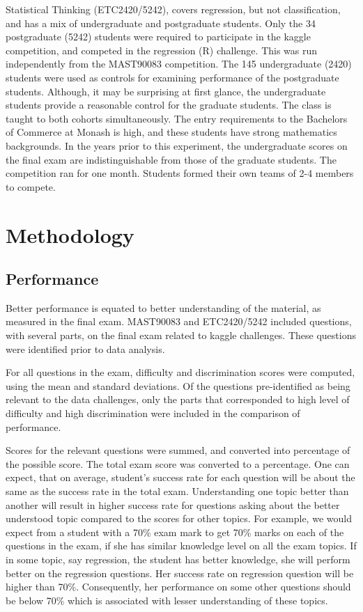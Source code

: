 \documentclass[12pt]{article}
\begin{document}
Statistical Thinking (ETC2420/5242), covers regression, but not
classification, and has a mix of undergraduate and postgraduate
students. Only the 34 postgraduate (5242) students were required to
participate in the kaggle competition, and competed in the regression
(R) challenge. This was run independently from the MAST90083
competition. The 145 undergraduate (2420) students were used as controls
for examining performance of the postgraduate students. Although, it may
be surprising at first glance, the undergraduate students provide a
reasonable control for the graduate students. The class is taught to
both cohorts simultaneously. The entry requirements to the Bachelors of
Commerce at Monash is high, and these students have strong mathematics
backgrounds. In the years prior to this experiment, the undergraduate
scores on the final exam are indistinguishable from those of the
graduate students. The competition ran for one month. Students formed
their own teams of 2-4 members to compete.

\section{Methodology}\label{methodology}

\subsection{Performance}\label{performance}

Better performance is equated to better understanding of the material,
as measured in the final exam. MAST90083 and ETC2420/5242 included
questions, with several parts, on the final exam related to kaggle
challenges. These questions were identified prior to data analysis.

For all questions in the exam, difficulty and discrimination scores were
computed, using the mean and standard deviations. Of the questions
pre-identified as being relevant to the data challenges, only the parts
that corresponded to high level of difficulty and high discrimination
were included in the comparison of performance.

Scores for the relevant questions were summed, and converted into
percentage of the possible score. The total exam score was converted to
a percentage. One can expect, that on average, student's success rate
for each question will be about the same as the success rate in the
total exam. Understanding one topic better than another will result in
higher success rate for questions asking about the better understood
topic compared to the scores for other topics. For example, we would
expect from a student with a 70\% exam mark to get 70\% marks on each of
the questions in the exam, if she has similar knowledge level on all the
exam topics. If in some topic, say regression, the student has better
knowledge, she will perform better on the regression questions. Her
success rate on regression question will be higher than 70\%.
Consequently, her performance on some other questions should be below
70\% which is associated with lesser understanding of these topics.
\end{document}
